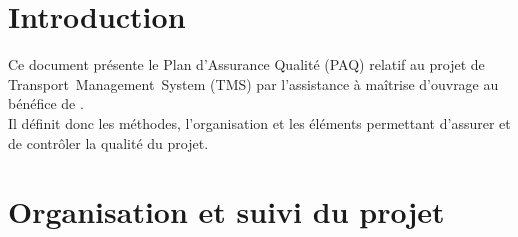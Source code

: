 \documentclass[11pt,fleqn]{report}
\begin{document}
\ZMakeCover


\ZMakeTableOfContents

\chapter{Introduction}
Ce document présente le Plan d'Assurance Qualité (PAQ) relatif au projet de Transport~Management~System (TMS) par l'assistance à maîtrise d'ouvrage \amo au bénéfice de \mo.
\\
Il définit donc les méthodes, l'organisation et les éléments permettant d'assurer et de contrôler la qualité du projet.

\chapter{Organisation et suivi du projet}
\end{document}
